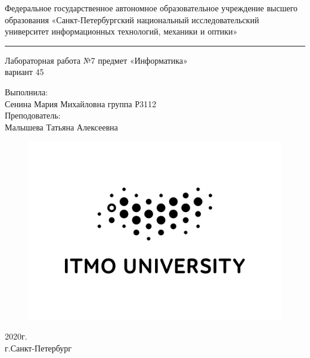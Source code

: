\pagestyle{empty} 
\begin{center}
\Large{Федеральное государственное автономное
образовательное учреждение высшего образования
«Санкт-Петербургский национальный исследовательский университет
информационных технологий, механики и оптики»}
\end{center}

\noindent\rule{\textwidth}{1pt}

\begin{center}
\LARGE{Лабораторная работа №7 предмет «Информатика»}
\\ \Large{вариант 45}
\end{center}
\vspace*{\fill}

\begin{flushright}
\large{Выполнила:
\\ Сенина Мария Михайловна группа Р3112 
\\Преподователь: 
\\Малышева Татьяна Алексеевна
}
\end{flushright}

\begin{figure}[h!]
\centering
\includegraphics[scale=0.7]{ITMO.jpg}
\label{fig:universe}
\end{figure}

\begin{center}
\Large{
    2020г.
    \\г.Санкт-Петербург}
\end{center}